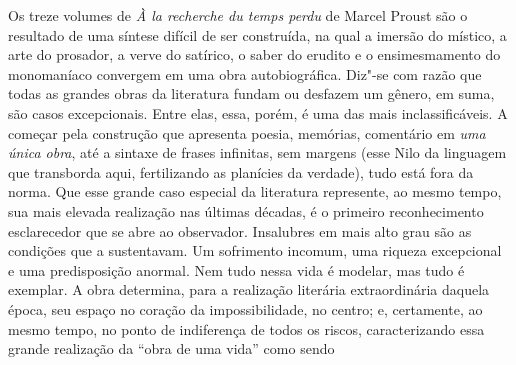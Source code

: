 \noindent{}Os treze volumes de \emph{À la recherche du temps perdu} de Marcel
Proust são o resultado de uma síntese difícil de ser construída, na qual
a imersão do místico, a arte do prosador, a verve do satírico, o saber
do erudito e o ensimesmamento do monomaníaco convergem em uma obra
autobiográfica. Diz"-se com razão que todas as grandes obras da
literatura fundam ou desfazem um gênero, em suma, são casos
excepcionais. Entre elas, essa, porém, é uma das mais inclassificáveis.
A começar pela construção que apresenta poesia, memórias, comentário em
\emph{uma única obra}, até a sintaxe de frases infinitas, sem margens
(esse Nilo da linguagem que transborda aqui, fertilizando as planícies
da verdade), tudo está fora da norma. Que esse grande caso especial da
literatura represente, ao mesmo tempo, sua mais elevada realização nas
últimas décadas, é o primeiro reconhecimento esclarecedor que se abre ao
observador. Insalubres em mais alto grau são as condições que a
sustentavam. Um sofrimento incomum, uma riqueza excepcional e uma
predisposição anormal. Nem tudo nessa vida é modelar, mas tudo é
exemplar. A obra determina, para a realização literária extraordinária
daquela época, seu espaço no coração da impossibilidade, no centro; e,
certamente, ao mesmo tempo, no ponto de indiferença de todos os riscos,
caracterizando essa grande realização da ``obra de uma vida'' como sendo
